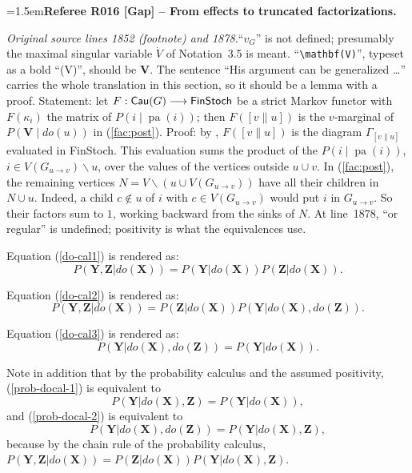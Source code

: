 \documentclass[12pt]{amsart}
\newcommand{\RefereeRemark}[4]{%
  \par\medskip\begingroup\normalfont\small\color{RefereePurple}%
  \emergencystretch=1.5em\noindent\textbf{Referee R#1 [#2] -- #3.}\par\nobreak\noindent #4\par
  \endgroup\medskip
}
\theoremstyle{plain}
\theoremstyle{definition}
\theoremstyle{remark}
\numberwithin{equation}{section}
\theoremstyle{plain}
\newcommand{\0}{\emptyset}
\newcommand{\fun}{\longrightarrow}
\newcommand{\mi}{\smallsetminus}
\newcommand{\cat}[1]{\textup{\textsf{#1}}}
\DeclareMathOperator{\cau}{\sf{Cau}}
\DeclareMathOperator{\pa}{pa}
\newcommand{\stri}{\Gamma}
\begin{document}
\hypertarget{review-016}{}\RefereeRemark{016}{Gap}{From effects to truncated factorizations}{%
\textit{Original source lines 1852 (footnote) and 1878.}\quad ``$v_G$'' is not defined; presumably the maximal singular variable $\dot V$ of Notation~3.5 is meant. ``\texttt{\textbackslash mathbf(V)}'', typeset as a bold ``(V)'', should be $\mathbf{V}$. The sentence ``His argument can be generalized \ldots'' carries the whole translation in this section, so it should be a lemma with a proof. Statement: let $F : \cau(G) \fun \cat{FinStoch}$ be a strict Markov functor with $F(\kappa_i)$ the matrix of $P(i \mid \pa(i))$; then $F([v \| u])$ is the $v$-marginal of $P(\mathbf{V} \mid do(u))$ in (\ref{fac:post}). Proof: by \cite[Proposition~5.6]{YinZhangModularity}, $F([v \| u])$ is the diagram $\stri_{[v \| u]}$ evaluated in \cat{FinStoch}. This evaluation sums the product of the $P(i \mid \pa(i))$, $i \in V(G_{u \rightarrow v}) \mi u$, over the values of the vertices outside $u \cup v$. In (\ref{fac:post}), the remaining vertices $N = V \mi (u \cup V(G_{u \rightarrow v}))$ have all their children in $N \cup u$. Indeed, a child $c \notin u$ of $i$ with $c \in V(G_{u \rightarrow v})$ would put $i$ in $G_{u \rightarrow v}$. So their factors sum to $1$, working backward from the sinks of $N$. At line~1878, ``or regular'' is undefined; positivity is what the equivalences use.
}

Equation (\ref{do-cal1}) is rendered as:
\begin{equation}
\label{prob-docal-1}
P(\mathbf{Y}, \mathbf{Z} | do(\mathbf{X})) = P(\mathbf{Y} | do(\mathbf{X}))P(\mathbf{Z} | do(\mathbf{X})).
\end{equation}

Equation (\ref{do-cal2}) is rendered as:
\begin{equation}
\label{prob-docal-2}
P(\mathbf{Y}, \mathbf{Z} | do(\mathbf{X})) = P(\mathbf{Z}| do(\mathbf{X}))P(\mathbf{Y} | do(\mathbf{X}), do(\mathbf{Z})).
\end{equation}

Equation (\ref{do-cal3}) is rendered as:  \begin{equation}
\label{prob-docal-3}
P(\mathbf{Y}| do(\mathbf{X}), do(\mathbf{Z})) = P(\mathbf{Y}| do(\mathbf{X})).
\end{equation}

Note in addition that by the probability calculus and the assumed positivity, (\ref{prob-docal-1}) is equivalent to \[
P(\mathbf{Y} | do(\mathbf{X}), \mathbf{Z}) = P(\mathbf{Y} | do(\mathbf{X})),
\]
and (\ref{prob-docal-2}) is equivalent to \[
P(\mathbf{Y} | do(\mathbf{X}), do(\mathbf{Z})) = P(\mathbf{Y} | do(\mathbf{X}), \mathbf{Z}),
\] because by the chain rule of the probability calculus, $P(\mathbf{Y}, \mathbf{Z} | do(\mathbf{X})) = P(\mathbf{Z}| do(\mathbf{X}))P(\mathbf{Y} | do(\mathbf{X}), \mathbf{Z})$.
\end{document}
